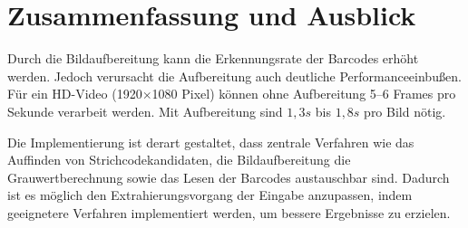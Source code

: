 \chapter{Zusammenfassung und Ausblick}
Durch die Bildaufbereitung kann die Erkennungsrate der Barcodes erhöht werden.
Jedoch verursacht die Aufbereitung auch deutliche Performanceeinbußen.
Für ein HD-Video (1920$\times$1080 Pixel) können ohne Aufbereitung 5--6 Frames pro Sekunde verarbeit werden.
Mit Aufbereitung sind $1,\!3\unit{s}$ bis $1,\!8\unit{s}$ pro Bild nötig.

Die Implementierung ist derart gestaltet, dass zentrale Verfahren wie das Auffinden von Strichcodekandidaten, die Bildaufbereitung die Grauwertberechnung sowie das Lesen der Barcodes austauschbar sind.
Dadurch ist es möglich den Extrahierungsvorgang der Eingabe anzupassen, indem geeignetere Verfahren implementiert werden, um bessere Ergebnisse zu erzielen.

